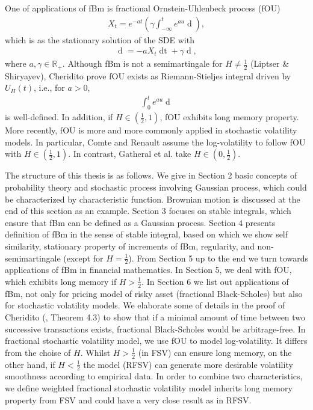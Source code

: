 \documentclass[a4paper, twoside, 11pt]{article}
\theoremstyle{definition}
\newcommand{\brkt}[1]{\left({#1} \right)}
\begin{document}
One of applications of fBm is fractional Ornstein-Uhlenbeck process (fOU) 
\begin{eqnarray*}
  X_t = e^{-at}\brkt{\gamma\int_{-\infty}^t e^{au}\mathop{dU_H(u)}},
\end{eqnarray*}
which is as the stationary solution of the SDE with 
\begin{eqnarray*}
  \mathop{dX_t} = -aX_t\mathop{dt} + \gamma\mathop{dU_H(t)},
\end{eqnarray*}
where $a,\gamma \in \mathbb{R}_+$. Although fBm is not a semimartingale for $H\neq \frac{1}{2}$ (Liptser \& Shiryayev\cite{liptshir}), Cheridito prove fOU exists as Riemann-Stieljes integral driven by $U_H(t)$, i.e., for $a>0$,
\begin{eqnarray*}
  \int_{0}^t e^{au}\mathop{dU_H(u)}
\end{eqnarray*}
is well-defined. In addition, if $H\in(\frac{1}{2}, 1)$, fOU exhibits long memory property. More recently, fOU is more and more commonly applied in stochastic volatility models. In particular, Comte and Renault\cite{comren} assume the log-volatility to follow fOU with $H\in(\frac{1}{2}, 1)$. In contrast, Gatheral et al.\cite{Gatheral} take $H \in (0, \frac{1}{2})$.

The structure of this thesis is as follows. We give in Section 2 basic concepts of probability theory and stochastic process involving Gaussian process, which could be characterized by characteristic function. Brownian motion is discussed at the end of this section as an example. Section 3 focuses on stable integrals, which ensure that fBm can be defined as a Gaussian process. Section 4 presents definition of fBm in the sense of stable integral, based on which we show self similarity, stationary property of increments of fBm, regularity, and non-semimartingale (except for $H=\frac{1}{2}$). From Section 5 up to the end we turn towards applications of fBm in financial mathematics. In Section 5, we deal with fOU, which exhibits long memory if $H > \frac{1}{2}$. In Section 6 we list out applications of fBm, not only for pricing model of risky asset (fractional Black-Scholes)  but also for stochastic volatility models. We elaborate some of details in the proof of Cheridito (\cite{chridito}, Theorem 4.3) to show that if a minimal amount of time between two successive transactions exists, fractional Black-Scholes would be arbitrage-free. In fractional stochastic volatility model, we use fOU to model log-volatility. It differs from the choise of $H$. Whilst $H>\frac{1}{2}$ (in FSV) can ensure long memory, on the other hand, if $H < \frac{1}{2}$ the model (RFSV) can generate more desirable volatility smoothness according to empirical data. In order to combine two characteristics, we define weighted fractional stochastic volatility model inherits long memory property from FSV and could have a very close result as in RFSV.
\end{document}
